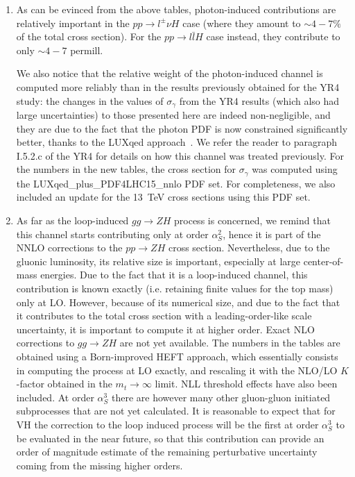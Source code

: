 \begin{enumerate}
\item As can be evinced from the above tables, photon-induced
  contributions are relatively important in the $p p \to l^\pm \nu H$
  case (where they amount to $\sim 4-7 \%$ of the total cross
  section). For the $pp\to l\bar l H$ case instead, they contribute to
  only $\sim 4-7$ permill.

  We also notice that the relative weight of the photon-induced
  channel is computed more reliably than in the results previously obtained
  for the YR4 study: the changes in the values of $\sigma_\gamma$ from
  the YR4 results (which also had large uncertainties) to those
  presented here are indeed non-negligible, and they are due to the
  fact that the photon PDF is now constrained significantly better, thanks to
  the LUXqed approach~\cite{Manohar:2016nzj,Manohar:2017eqh}. We refer
  the reader to paragraph I.5.2.c of the YR4 for details on how this
  channel was treated previously. For the numbers in the new tables,
  the cross section for $\sigma_\gamma$ was computed using the
  LUXqed\_plus\_PDF4LHC15\_nnlo PDF set. For completeness, we also
  included an update for the 13~TeV cross sections using this PDF set.
  
\item As far as the loop-induced $gg\rightarrow ZH$ process is
  concerned, we remind that this channel starts contributing only at
  order $\alpha_S^2$, hence it is part of the NNLO corrections to the
  $pp \rightarrow ZH$ cross section. Nevertheless, due to the gluonic
  luminosity, its relative size is important, especially at large
  center-of-mass energies.
Due to the fact that it is a loop-induced channel, this contribution
is known exactly (i.e. retaining finite values for the top mass) only at
LO.  However, because of its numerical size, and due to the fact that
it contributes to the total cross section with a leading-order-like
scale uncertainty, it is important to compute it at higher order.
Exact NLO corrections to $gg \rightarrow ZH$ are not yet available. The numbers in
the tables are obtained using a Born-improved HEFT approach, which
essentially consists in computing the process at LO exactly, and
rescaling it with the NLO/LO $K$-factor obtained in the
$m_t\to\infty$ limit. NLL threshold effects have also been
included. At order $\alpha_S^3$ there are however many other gluon-gluon initiated subprocesses
that are not yet calculated. It is reasonable
to expect that for VH the correction to the loop induced process will be the
first at order $\alpha_S^3$ to be evaluated in the near future, so that this contribution can provide an order of magnitude estimate of the remaining
perturbative uncertainty
coming from the missing higher orders.
\end{enumerate}

